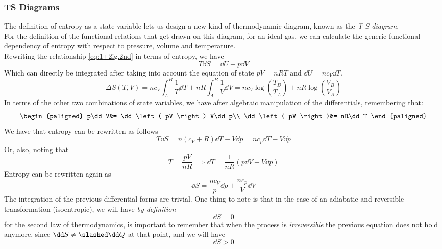 \documentclass[../qm.tex]{subfiles}
\begin{document}
\subsubsection{TS Diagrams}
The definition of entropy as a state variable lets us design a new kind of thermodynamic diagram, known as the \emph{T-S diagram}.\\
For the definition of the functional relations that get drawn on this diagram, for an ideal gas, we can calculate the generic functional dependency of entropy with respect to pressure, volume and temperature.\\
Rewriting the relationship \eqref{eq:1+2ig.2nd} in terms of entropy, we have
\begin{equation*}
	T\dd S=\dd U+p\dd V
\end{equation*}
Which can directly be integrated after taking into account the equation of state $pV=nRT$ and $\dd U=nc_V\dd T$.\\
\begin{equation*}
	\Delta S(T, V)=nc_V\int_{A}^{B}\frac{1}{T}\dd^{}{T}+nR\int_{A}^{B}\frac{1}{V}\dd^{}{V}=nc_V\log\left( \frac{T_B}{T_A} \right)+nR\log\left( \frac{V_B}{V_A} \right)
\end{equation*}
In terms of the other two combinations of state variables, we have after algebraic manipulation of the differentials, remembering that:
\begin{equation*}
	\begin{paligned}
		p\dd V&= \dd\left( pV \right)-V\dd p\\
		\dd\left( pV \right)&= nR\dd T
	\end{paligned}
\end{equation*}
We have that entropy can be rewritten as follows
\begin{equation*}
	T\dd S=n\left( c_V+R \right)\dd T-V\dd p=nc_p\dd T-V\dd p
\end{equation*}
Or, also, noting that
\begin{equation*}
	T=\frac{pV}{nR}\implies\dd T=\frac{1}{nR}\left( p\dd V+V\dd p \right)
\end{equation*}
Entropy can be rewritten again as
\begin{equation*}
	\dd S= \frac{nc_V}{p}\dd p+\frac{nc_p}{V}\dd V
\end{equation*}
The integration of the previous differential forms are trivial. One thing to note is that in the case of an adiabatic and reversible transformation (isoentropic), we will have \textit{by definition}
\begin{equation*}
	\dd S = 0
\end{equation*}
for the second law of thermodynamics, is important to remember that when the process is \textit{irreversible} the previous equation does not hold anymore, since $\dd S\ne\slashed\dd Q$ at that point, and we will have
\begin{equation*}
	\dd S > 0
\end{equation*}
\end{document}
